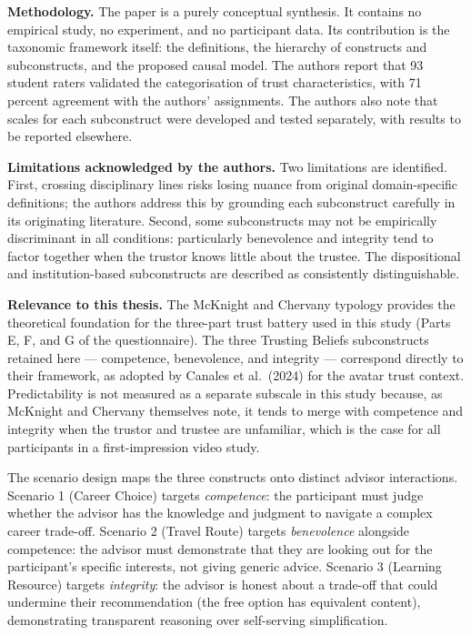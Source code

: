 \documentclass[11pt, a4paper]{article}
\begin{document}
\medskip
\noindent\textbf{Methodology.} The paper is a purely conceptual synthesis. It contains no empirical study, no experiment, and no participant data. Its contribution is the taxonomic framework itself: the definitions, the hierarchy of constructs and subconstructs, and the proposed causal model. The authors report that 93 student raters validated the categorisation of trust characteristics, with 71 percent agreement with the authors' assignments. The authors also note that scales for each subconstruct were developed and tested separately, with results to be reported elsewhere.

\medskip
\noindent\textbf{Limitations acknowledged by the authors.} Two limitations are identified. First, crossing disciplinary lines risks losing nuance from original domain-specific definitions; the authors address this by grounding each subconstruct carefully in its originating literature. Second, some subconstructs may not be empirically discriminant in all conditions: particularly benevolence and integrity tend to factor together when the trustor knows little about the trustee. The dispositional and institution-based subconstructs are described as consistently distinguishable.

\medskip
\noindent\textbf{Relevance to this thesis.} The McKnight and Chervany typology provides the theoretical foundation for the three-part trust battery used in this study (Parts E, F, and G of the questionnaire). The three Trusting Beliefs subconstructs retained here --- competence, benevolence, and integrity --- correspond directly to their framework, as adopted by Canales et al.\ (2024) for the avatar trust context. Predictability is not measured as a separate subscale in this study because, as McKnight and Chervany themselves note, it tends to merge with competence and integrity when the trustor and trustee are unfamiliar, which is the case for all participants in a first-impression video study.

The scenario design maps the three constructs onto distinct advisor interactions. Scenario 1 (Career Choice) targets \textit{competence}: the participant must judge whether the advisor has the knowledge and judgment to navigate a complex career trade-off. Scenario 2 (Travel Route) targets \textit{benevolence} alongside competence: the advisor must demonstrate that they are looking out for the participant's specific interests, not giving generic advice. Scenario 3 (Learning Resource) targets \textit{integrity}: the advisor is honest about a trade-off that could undermine their recommendation (the free option has equivalent content), demonstrating transparent reasoning over self-serving simplification.
\end{document}
